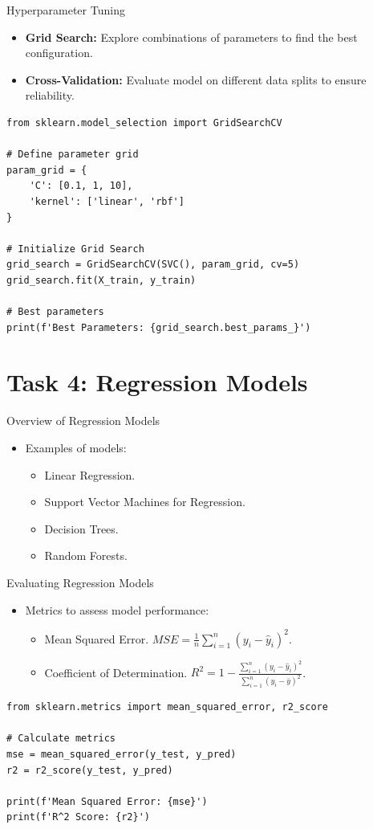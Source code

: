 \documentclass{beamer}
\begin{document}
\begin{frame}[fragile]{Hyperparameter Tuning}
\begin{itemize}
    \item \textbf{Grid Search:} Explore combinations of parameters to find the best configuration.
    \item \textbf{Cross-Validation:} Evaluate model on different data splits to ensure reliability.
\end{itemize}
\begin{lstlisting}
from sklearn.model_selection import GridSearchCV

# Define parameter grid
param_grid = {
    'C': [0.1, 1, 10],
    'kernel': ['linear', 'rbf']
}

# Initialize Grid Search
grid_search = GridSearchCV(SVC(), param_grid, cv=5)
grid_search.fit(X_train, y_train)

# Best parameters
print(f'Best Parameters: {grid_search.best_params_}')
\end{lstlisting}
\end{frame}

\section{Task 4: Regression Models}

\begin{frame}{Overview of Regression Models}
\begin{itemize}
    \item Examples of models:
    \begin{itemize}
        \item Linear Regression.
        \item Support Vector Machines for Regression.
        \item Decision Trees.
        \item Random Forests.
    \end{itemize}
\end{itemize}
\end{frame}

\begin{frame}[fragile]{Evaluating Regression Models}
\begin{itemize}
    \item Metrics to assess model performance:
    \begin{itemize}
        \item Mean Squared Error. $MSE=\frac{1}{n} \sum_{i=1}^{n} (y_i - \hat{y}_i)^2$.
        \item Coefficient of Determination. $R^2 = 1 - \frac{\sum_{i=1}^{n} (y_i - \hat{y}_i)^2}{\sum_{i=1}^{n} (y_i - \bar{y})^2}$.
    \end{itemize}
\end{itemize}
\begin{lstlisting}
from sklearn.metrics import mean_squared_error, r2_score

# Calculate metrics
mse = mean_squared_error(y_test, y_pred)
r2 = r2_score(y_test, y_pred)

print(f'Mean Squared Error: {mse}')
print(f'R^2 Score: {r2}')
\end{lstlisting}
\end{frame}
\end{document}
